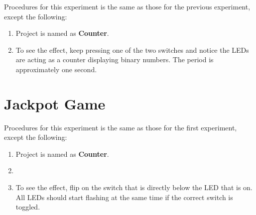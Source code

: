 \documentclass[11pt,letterpaper,titlepage]{article}
\begin{document}
Procedures for this experiment is the same as those for the previous experiment, except the following:

\begin{enumerate}
    \item Project is named as \textbf{Counter}.
    
    
    
    
    
    \item To see the effect, keep pressing one of the two switches and notice the LEDs are acting as a counter displaying binary numbers. The period is approximately one second.
    
    
\end{enumerate}

\section{Jackpot Game}

Procedures for this experiment is the same as those for the first experiment, except the following:

\begin{enumerate}
    \item Project is named as \textbf{Counter}.
    
    \item
    
    
    
    
    
    \item To see the effect, flip on the switch that is directly below the LED that is on. All LEDs should start flashing at the same time if the correct switch is toggled.
    
    
\end{enumerate}
\end{document}
